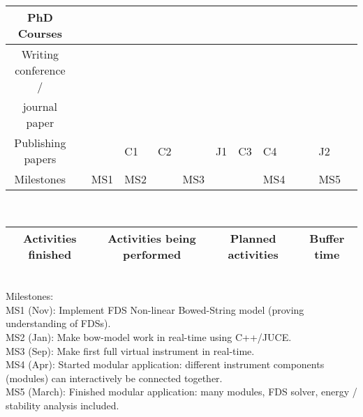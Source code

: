 \begin{tabular}{|c|p{\tabcolwidth}|p{\tabcolwidth}|p{\tabcolwidth}|p{\tabcolwidth}|p{\tabcolwidth}|p{\tabcolwidth}|p{\tabcolwidth}|p{\tabcolwidth}|p{\tabcolwidth}|p{\tabcolwidth}|p{\tabcolwidth}|p{\tabcolwidth}|}
     \hline PhD Courses & \cellcolor{green} & \cellcolor{green} & &  \cellcolor{green} & \cellcolor{lighterred} & \cellcolor{lighterred}& & & & & & \cellcolor{lighterblue}
     \\
     \hline 
      Writing conference /  & & \cellcolor{green} &\cellcolor{green}  & \cellcolor{green} & \cellcolor{lighterred} &\cellcolor{lighterred} &\cellcolor{lighterred} &\cellcolor{lighterred} & & &\cellcolor{lighterred} &
      \cellcolor{lighterblue}\\
     journal paper & & \cellcolor{green} & \cellcolor{green} & \cellcolor{green} &\cellcolor{lighterred} &\cellcolor{lighterred} &\cellcolor{lighterred} &\cellcolor{lighterred} & & & \cellcolor{lighterred}&
      \cellcolor{lighterblue}\\
     \hline 
     Publishing papers & & & \cellcolor{green}\centering C1 & \cellcolor{green}\centering C2 & & \cellcolor{lighterred} \centering J1 &\cellcolor{lighterred}\centering C3&\cellcolor{lighterred} \centering C4 & & & \cellcolor{lighterred} \centering J2 &  \cellcolor{lighterblue}
     \\
     \hline
     Milestones& & \centering MS1 \cellcolor{green} &\centering MS2 \cellcolor{green} & & MS3 \cellcolor{yellow} & & & \centering MS4 \cellcolor{lighterred} & & & \centering MS5 \cellcolor{lighterred}  & \cellcolor{lighterblue}
     \\
     \hline
\end{tabular}
\vspace{0.3cm}
\\
\begin{tabular}[h]{|c|c|c|c|}
\hline
\cellcolor{green} Activities finished & \cellcolor{yellow} Activities being performed & \cellcolor{lighterred} Planned activities & \cellcolor{lighterblue} Buffer time\\
\hline
\end{tabular}
\vspace{0.3cm}
\\
\normalsize
Milestones:
\\
MS1 (Nov): Implement FDS Non-linear Bowed-String model (proving understanding of FDSs).\\
MS2 (Jan): Make bow-model work in real-time using C++/JUCE.\\
MS3 (Sep): Make first full virtual instrument in real-time.\\
MS4 (Apr): Started modular application: different instrument components (modules) can interactively be connected together.\\
MS5 (March): Finished modular application: many modules, FDS solver, energy / stability analysis included. 

